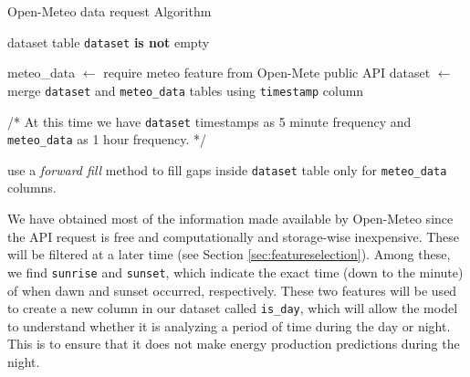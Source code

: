 
\begin{algorithm}[H]
	\caption{Open-Meteo data request Algorithm}\label{alg:openemeteo}
	\begin{algorithmic}
		\Require dataset table
		\Ensure \texttt{dataset} \textbf{is not} empty

		\State meteo\_data $\gets$ require meteo feature from Open-Mete public API
		\State dataset $\gets$ merge \texttt{dataset} and \texttt{meteo\_data} tables using \texttt{timestamp} column

		\State
		\State /* At this time we have \texttt{dataset} timestamps as 5 minute frequency and \texttt{meteo\_data} as 1 hour frequency. */
		\State

		\State use a \textit{forward fill} method to fill gaps inside \texttt{dataset} table only for \texttt{meteo\_data} columns.
	\end{algorithmic}
\end{algorithm}

We have obtained most of the information made available by Open-Meteo since the API
request is free and computationally and storage-wise inexpensive.
These will be filtered at a later time (see Section \ref{sec:featureselection}).
Among these, we find \texttt{sunrise} and \texttt{sunset}, which indicate the exact time
(down to the minute) of when dawn and sunset occurred, respectively.
These two features will be used to create a new column in our dataset called
\texttt{is\_day}, which will allow the model to understand whether it is
analyzing a period of time during the day or night.
This is to ensure that it does not make energy production predictions
during the night.


